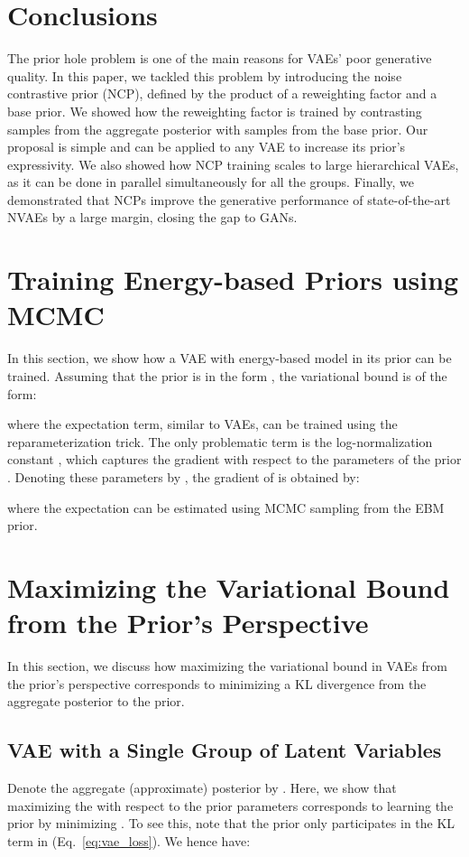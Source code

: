 \documentclass{article} \usepackage{iclr2021_conference,times}
\begin{document}
 \vspace{-0.2cm}
\section{Conclusions}
\vspace{-0.2cm}
The prior hole problem is one of the main reasons for VAEs' poor generative quality. In this paper, we tackled this problem by introducing the noise contrastive prior (NCP), defined by the product of a reweighting factor and a base prior. We showed how the reweighting factor is trained by contrasting samples from the aggregate posterior with samples from the base prior. Our proposal is simple and can be applied to any VAE to increase its prior's expressivity. We also showed how NCP training scales to large hierarchical VAEs, as it can be done in parallel simultaneously for all the groups. Finally, we demonstrated that NCPs improve the generative performance of state-of-the-art NVAEs by a large margin, closing the gap to GANs. 

\newpage
\appendix
\section{Training Energy-based Priors using MCMC}\label{app:mcmc}
In this section, we show how a VAE with energy-based model in its prior can be trained. Assuming that the prior is in the form , the variational bound is of the form:

where the expectation term, similar to VAEs, can be trained using the reparameterization trick. The only problematic term is the log-normalization constant , which  captures the gradient with respect to the parameters of the prior . Denoting these parameters by , the gradient of  is obtained by:

where the expectation can be estimated using MCMC sampling from the EBM prior.

\section{Maximizing the Variational Bound from the Prior's Perspective}
In this section, we discuss how maximizing the variational bound in VAEs from the prior's perspective corresponds to minimizing a KL divergence from the aggregate posterior to the  prior. 

\subsection{VAE with a Single Group of Latent Variables} \label{app:vae_prior}
Denote the aggregate (approximate) posterior by . Here, we show that maximizing the  with respect to the prior parameters corresponds to learning the prior by minimizing  . To see this,  note that the prior  only participates in the KL term in  (Eq.~\ref{eq:vae_loss}). We hence have:
\end{document}
